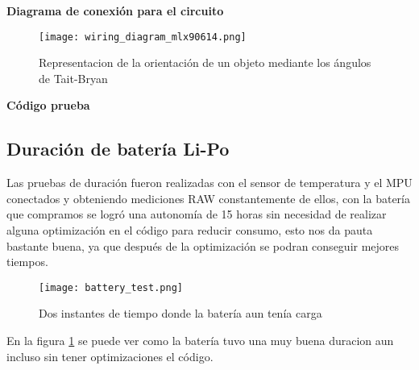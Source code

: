         \textbf{Diagrama de conexión para el circuito}
        \begin{figure}[htp!]
            \centering
                \texttt{[image: wiring\_diagram\_mlx90614.png]}
                \caption{Representacion de la orientación de un objeto mediante los ángulos de Tait-Bryan}
            \end{figure}
            \FloatBarrier 
        \textbf{Código prueba}

        \lstset{style=mystyle}

        
        
        \subsection{Duración de batería Li-Po}
        
        Las pruebas de duración fueron realizadas con el sensor de temperatura y el MPU conectados y obteniendo mediciones RAW 
        constantemente de ellos, con la batería que compramos se logró una autonomía de 15 horas sin necesidad de realizar alguna 
        optimización en el código para reducir consumo, esto nos da pauta bastante buena, ya que después de la optimización se 
        podran conseguir mejores tiempos.

        \begin{figure}[htp!]
            \centering
                 \texttt{[image: battery\_test.png]}
                  \caption{Dos instantes de tiempo donde la batería aun tenía carga }
                  \label{fig: battery_test}
        \end{figure}
        \FloatBarrier

        En la figura \ref{fig: battery_test} se puede ver como la batería tuvo una muy buena duracion aun incluso sin tener optimizaciones
        el código.

